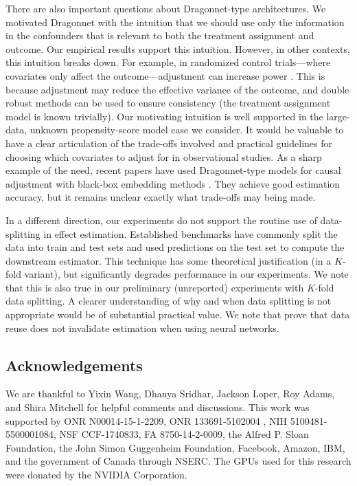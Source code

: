 \documentclass{article}
\begin{document}
  There are also important questions about Dragonnet-type architectures.
  We motivated Dragonnet with the intuition that we should use only the information in the confounders that is relevant to both
  the treatment assignment and outcome. Our empirical results support this intuition. However, in other contexts, this intuition breaks down.
  For example, in randomized control trials---where covariates only affect the outcome---adjustment can increase power \cite{Saquib:Saquib:Ioannidis:2013}. This is because adjustment may reduce the effective variance of the outcome, and double robust methods can be used to ensure consistency (the treatment assignment model is known trivially). Our motivating intuition is well supported in the
  large-data, unknown propensity-score model case we consider. It would be valuable to have a clear articulation of the trade-offs involved
  and practical guidelines for choosing which covariates to adjust for in observational studies.
  As a sharp example of the need, recent papers have used Dragonnet-type models for causal adjustment with black-box embedding methods \cite{Veitch:Wang:Blei:2019,Veitch:Sridhar:Blei:2019}. They achieve good estimation accuracy, but it remains unclear exactly what trade-offs may being made.
  
  In a different direction, our experiments do not support the routine use of data-splitting in effect estimation.
  Established benchmarks have commonly split the data into train and test sets and used predictions on the test set to compute the
  downstream estimator. This technique has some theoretical justification \citep{Chernozhukov:Chetverikov:Demirer:Duflo:Hansen:Newey:2017} (in a $K$-fold variant), but significantly degrades performance in our experiments.
  We note that this is also true in our preliminary (unreported) experiments with $K$-fold data splitting.
  A clearer understanding of why and when data splitting is not appropriate would be of substantial practical value.
  We note that \citet{Farrell:Liang:Misra:2018} prove that data reuse does not invalidate estimation when using neural networks.
  

\subsection*{Acknowledgements}
We are thankful to Yixin Wang, Dhanya Sridhar, 
Jackson Loper, Roy Adams, and Shira Mitchell for helpful comments and discussions.
This work was supported by ONR N00014-15-1-2209, ONR 133691-5102004 , NIH 5100481-5500001084, NSF CCF-1740833, FA 8750-14-2-0009, the Alfred P. Sloan Foundation, the John Simon Guggenheim Foundation, Facebook, Amazon, IBM, and the government of Canada through NSERC. The GPUs used for this research were donated by the NVIDIA Corporation.
\end{document}

